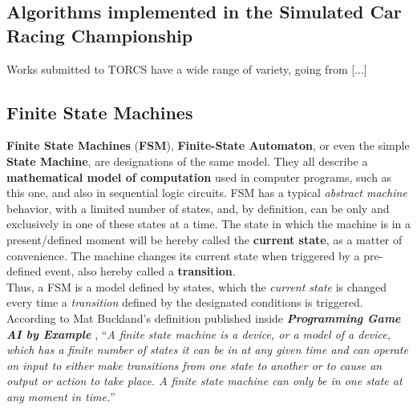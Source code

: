 	\subsection{Algorithms implemented in the Simulated Car Racing Championship}
	
	Works submitted to TORCS have a wide range of variety, going from [...]


	\subsection{Finite State Machines}
	
	\textbf{Finite State Machines} (\textbf{FSM}), \textbf{Finite-State Automaton}, or even the simple \textbf{State Machine},
	are designations of the same model. They all describe a \textbf{mathematical model of computation} used in computer 
	programs, such as this one, and also in sequential logic circuits. FSM has a typical \textit{abstract machine} behavior,
	with a limited number of states, and, by definition, can be only and exclusively in one of these states at a time. The 
	state in which the machine is in a present/defined moment will be hereby called the \textbf{current state}, as a matter
	of convenience. The machine changes its current state when triggered by a pre-defined event, also hereby called a 
	\textbf{transition}.\\
	
	Thus, a FSM is a model defined by states, which the \textit{current state} is changed every time a \textit{transition}
	defined by the designated conditions is triggered. According to Mat Buckland's definition published inside 
	\textbf{\emph{Programming Game AI by Example}} \cite{Prog-AI}, ``\emph{A finite state machine is a device, or a model
	of a device, which has a finite number of states it can be in at any given time and can operate on	input to either 
	make transitions from one state to another or to cause an output or action to take place. A finite state machine can
	only be in one	state at any moment in time.}''\\[0.2cm]
